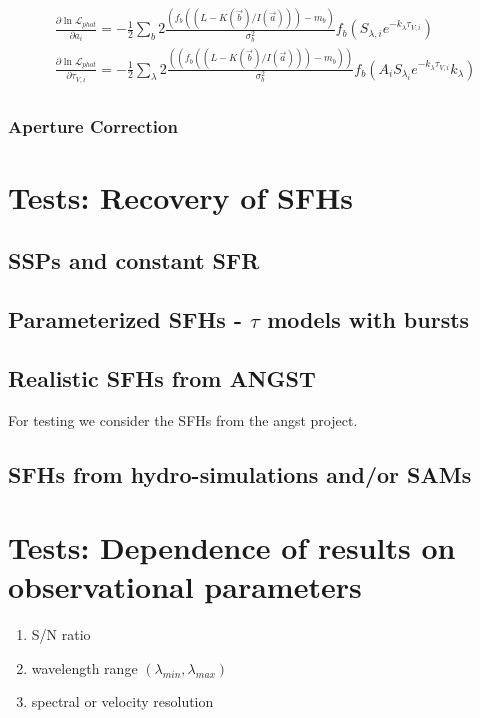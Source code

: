 \documentclass{emulateapj}
\begin{document}
\begin{equation}
\begin{split}
&\frac{\partial \ln\mathcal{L}_{phot}}{\partial a_i} = -\frac{1}{2}\sum\limits_b 2 \frac{(f_b((L-K(\vec{b})/I(\vec{a})))- m_b)}{\sigma_b^2} f_b(S_{\lambda,i} e^{-k_\lambda\tau_{V,i}}) \\
&\frac{\partial \ln\mathcal{L}_{phot}}{\partial \tau_{V,i}} = -\frac{1}{2}\sum\limits_\lambda 2 \frac{((f_b((L-K(\vec{b})/I(\vec{a})))- m_b))}{\sigma_b^2} f_b(A_iS_{\lambda_i} e^{-k_\lambda\tau_{V,i}} k_\lambda) \\
\end{split}
\end{equation}



\subsubsection{Aperture Correction}


\section{Tests: Recovery of SFHs}

\subsection{SSPs and constant SFR}

\subsection{Parameterized SFHs - $\tau$ models with bursts}

\subsection{Realistic SFHs from ANGST}
For testing we consider the SFHs from the angst project. 

\subsection{SFHs from hydro-simulations and/or SAMs}

\section{Tests: Dependence of results on observational parameters}

\begin{enumerate}
\item S/N ratio
\item wavelength range $(\lambda_{min}, \lambda_{max})$
\item spectral or velocity resolution
\end{enumerate}
\end{document}
